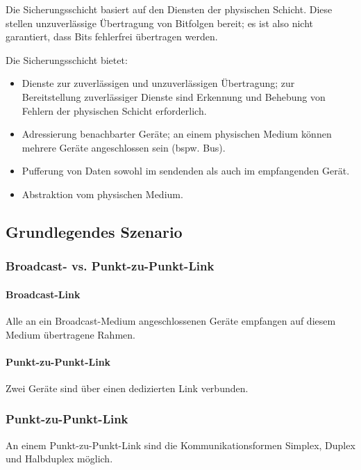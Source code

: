 \documentclass[a4paper, 14pt]{article}
\begin{document}
	Die Sicherungsschicht basiert auf den Diensten der physischen Schicht.
	Diese stellen unzuverlässige Übertragung von Bitfolgen bereit; es ist also nicht garantiert, dass Bits fehlerfrei übertragen werden.

	Die Sicherungsschicht bietet:

	\begin{itemize}
		\item Dienste zur zuverlässigen und unzuverlässigen Übertragung; zur Bereitstellung zuverlässiger Dienste sind Erkennung und Behebung von Fehlern der physischen Schicht erforderlich.
		\item Adressierung benachbarter Geräte; an einem physischen Medium können mehrere Geräte angeschlossen sein (bspw. Bus).
		\item Pufferung von Daten sowohl im sendenden als auch im empfangenden Gerät.
		\item Abstraktion vom physischen Medium.
	\end{itemize}

	\subsection{Grundlegendes Szenario}

	\subsubsection{Broadcast- vs. Punkt-zu-Punkt-Link}

	\paragraph{Broadcast-Link}

	Alle an ein Broadcast-Medium angeschlossenen Geräte empfangen auf diesem Medium übertragene Rahmen.

	\paragraph{Punkt-zu-Punkt-Link}

	Zwei Geräte sind über einen dedizierten Link verbunden.

	\subsubsection{Punkt-zu-Punkt-Link}

	An einem Punkt-zu-Punkt-Link sind die Kommunikationsformen Simplex, Duplex und Halbduplex möglich.
\end{document}
